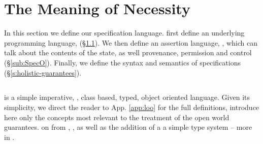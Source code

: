 
\section{The Meaning of Necessity}
\label{s:semantics}

 
In this section we define our \Nec specification language.
 first define 
an underlying programming language, \Loo  (\S \ref{sub:Loo}).
We then  define an assertion language, \SpecO,  which can talk about
 the contents of the state, as well  
provenance, permission and control (\S \ref{sub:SpecO}).
Finally, we define the syntax and semantics of 
\Nec specifications  (\S \ref{s:holistic-guarantees}).


\subsection{\Loo}
\label{sub:Loo} 
 \Loo is a  simple  imperative, , 
class based, typed, object oriented language.
 Given its simplicity, %
 we direct the reader to App. \ref{app:loo} for 
the full definitions,  introduce here only %
 the concepts most relevant to the
treatment of the open world guarantees.
 on \LangOO from
\cite{FASE}, , as well as 
the addition of a %
 a simple type system -- more in .


